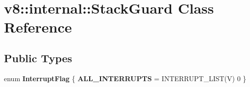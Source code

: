 \hypertarget{classv8_1_1internal_1_1StackGuard}{}\section{v8\+:\+:internal\+:\+:Stack\+Guard Class Reference}
\label{classv8_1_1internal_1_1StackGuard}
\subsection*{Public Types}
\begin{DoxyCompactItemize}
\item 
\mbox{\label{classv8_1_1internal_1_1StackGuard_ac114a7605ed03e1dccfa3b58ab575a37}} 
enum {\bfseries Interrupt\+Flag} \{ {\bfseries A\+L\+L\+\_\+\+I\+N\+T\+E\+R\+R\+U\+P\+TS} = I\+N\+T\+E\+R\+R\+U\+P\+T\+\_\+\+L\+I\+ST(V) 0
 \}
\end{DoxyCompactItemize}
